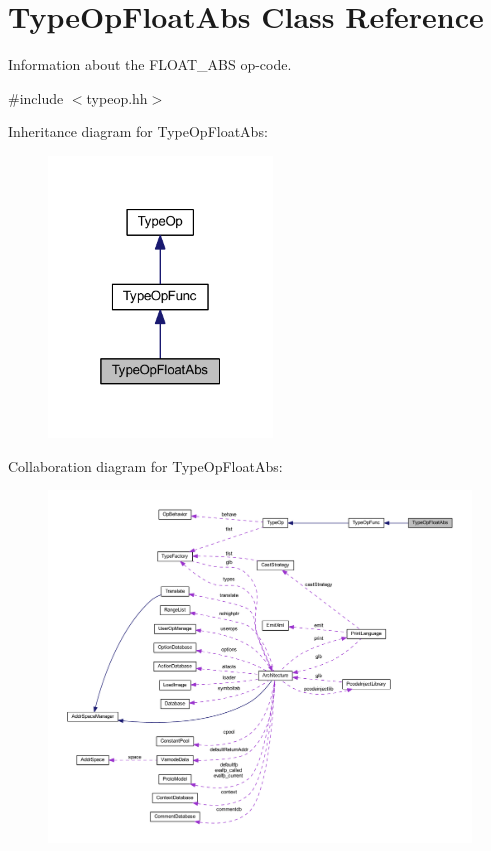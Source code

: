 \hypertarget{class_type_op_float_abs}{}\section{Type\+Op\+Float\+Abs Class Reference}
\label{class_type_op_float_abs}


Information about the F\+L\+O\+A\+T\+\_\+\+A\+BS op-\/code.  




{\ttfamily \#include $<$typeop.\+hh$>$}



Inheritance diagram for Type\+Op\+Float\+Abs\+:
\nopagebreak
\begin{figure}[H]
\begin{center}
\leavevmode
\includegraphics[width=169pt]{class_type_op_float_abs__inherit__graph}
\end{center}
\end{figure}


Collaboration diagram for Type\+Op\+Float\+Abs\+:
\nopagebreak
\begin{figure}[H]
\begin{center}
\leavevmode
\includegraphics[width=350pt]{class_type_op_float_abs__coll__graph}
\end{center}
\end{figure}
